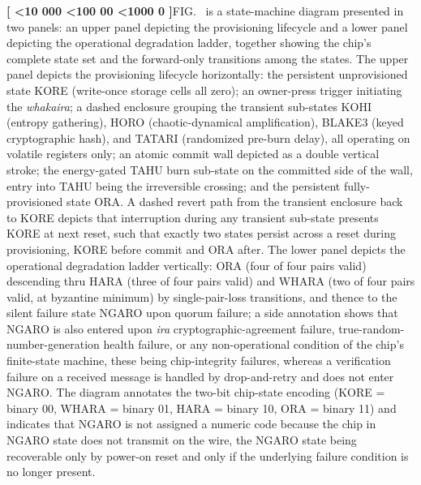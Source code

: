 \documentclass[12pt,letterpaper]{article}
\newcounter{para}
\newcommand{\padzero}{%
  \ifnum\value{para}<10 000\else%
  \ifnum\value{para}<100 00\else%
  \ifnum\value{para}<1000 0\else%
  \fi\fi\fi}
\newcommand{\para}{%
  \refstepcounter{para}\noindent\textbf{[\padzero\arabic{para}]}\hspace{0.5em}\ignorespaces}
\newcounter{fig}
\newcommand{\figdef}[1]{\refstepcounter{fig}\label{fig:#1}FIG.~\arabic{fig}}
\begin{document}
\para \figdef{states} is a state-machine diagram presented in two panels: an upper panel depicting the provisioning lifecycle and a lower panel depicting the operational degradation ladder, together showing the chip's complete state set and the forward-only transitions among the states.
The upper panel depicts the provisioning lifecycle horizontally: the persistent unprovisioned state KORE (write-once storage cells all zero); an owner-press trigger initiating the \emph{whakaira}; a dashed enclosure grouping the transient sub-states KOHI (entropy gathering), HORO (chaotic-dynamical amplification), BLAKE3 (keyed cryptographic hash), and TATARI (randomized pre-burn delay), all operating on volatile registers only; an atomic commit wall depicted as a double vertical stroke; the energy-gated TAHU burn sub-state on the committed side of the wall, entry into TAHU being the irreversible crossing; and the persistent fully-provisioned state ORA.
A dashed revert path from the transient enclosure back to KORE depicts that interruption during any transient sub-state presents KORE at next reset, such that exactly two states persist across a reset during provisioning, KORE before commit and ORA after.
The lower panel depicts the operational degradation ladder vertically: ORA (four of four pairs valid) descending thru HARA (three of four pairs valid) and WHARA (two of four pairs valid, at byzantine minimum) by single-pair-loss transitions, and thence to the silent failure state NGARO upon quorum failure; a side annotation shows that NGARO is also entered upon \emph{ira} cryptographic-agreement failure, true-random-number-generation health failure, or any non-operational condition of the chip's finite-state machine, these being chip-integrity failures, whereas a verification failure on a received message is handled by drop-and-retry and does not enter NGARO.
The diagram annotates the two-bit chip-state encoding (KORE = binary 00, WHARA = binary 01, HARA = binary 10, ORA = binary 11) and indicates that NGARO is not assigned a numeric code because the chip in NGARO state does not transmit on the wire, the NGARO state being recoverable only by power-on reset and only if the underlying failure condition is no longer present.
\end{document}
